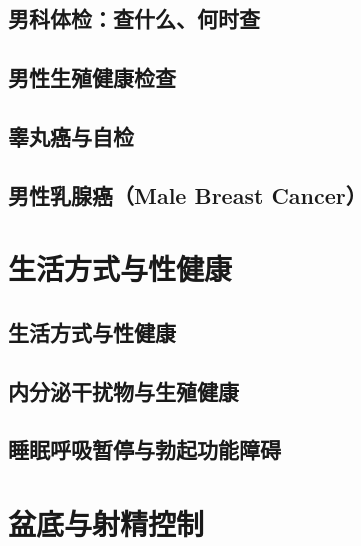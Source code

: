 \section{男科体检：查什么、何时查}

\section{男性生殖健康检查}

\section{睾丸癌与自检}

\section{男性乳腺癌（Male Breast Cancer）}

\chapter{生活方式与性健康}

\section{生活方式与性健康}

\section{内分泌干扰物与生殖健康}

\section{睡眠呼吸暂停与勃起功能障碍}

\chapter{盆底与射精控制}

